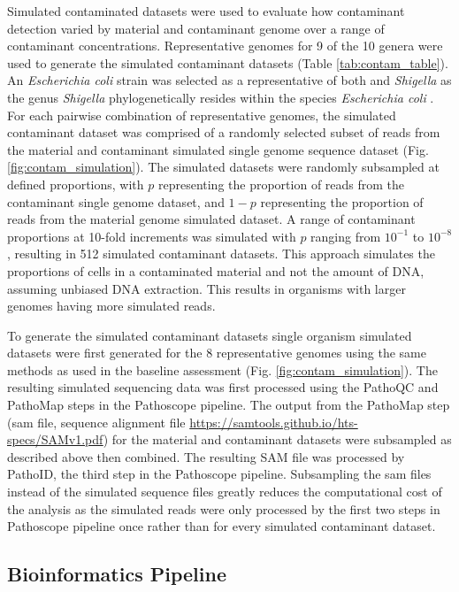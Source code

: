 \documentclass[fleqn,10pt,lineno]{wlpeerj}\usepackage[]{graphicx}\usepackage[]{color}
\begin{document}
Simulated contaminated datasets were used to evaluate how contaminant detection varied by material and contaminant genome over a range of contaminant concentrations.
Representative genomes for 9 of the 10 genera were used to generate the simulated contaminant datasets (Table \ref{tab:contam_table}).
An \textit{Escherichia coli} strain was selected as a representative of both  and \textit{Shigella} as the genus \textit{Shigella} phylogenetically resides within the species \textit{Escherichia coli} \citep{lan2002escherichia}.
For each pairwise combination of representative genomes, the simulated contaminant dataset was comprised of a randomly selected subset of reads from the material and contaminant simulated single genome sequence dataset (Fig. \ref{fig:contam_simulation}).
The simulated datasets were randomly subsampled at defined proportions, with $p$ representing the proportion of reads from the contaminant single genome dataset, and $1-p$ representing the proportion of reads from the material genome simulated dataset.
A range of contaminant proportions at 10-fold increments was simulated with $p$ ranging from $10^{-1}$ to $10^{-8}$, resulting in 512 simulated contaminant datasets.
This approach simulates the proportions of cells in a contaminated material and not the amount of DNA, assuming unbiased DNA extraction. 
This results in organisms with larger genomes having more simulated reads.  


To generate the simulated contaminant datasets single organism simulated datasets were first generated for the 8 representative genomes using the same methods as used in the baseline assessment (Fig. \ref{fig:contam_simulation}).
The resulting simulated sequencing data was first processed using the PathoQC and PathoMap steps in the Pathoscope pipeline.
The output from the PathoMap step (sam file, sequence alignment file \url{https://samtools.github.io/hts-specs/SAMv1.pdf}) for the material and contaminant datasets were subsampled as described above then combined. 
The resulting SAM file was processed by PathoID, the third step in the Pathoscope pipeline.
Subsampling the sam files instead of the simulated sequence files greatly reduces the computational cost of the analysis as the simulated reads were only processed by the first two steps in Pathoscope pipeline once rather than for every simulated contaminant dataset.


\subsection*{Bioinformatics Pipeline}
\end{document}
